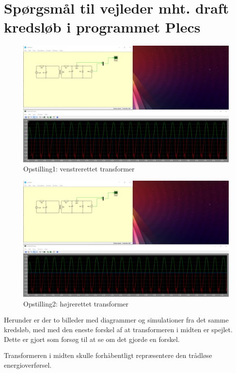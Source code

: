\documentclass[a4paper,11pt]{memoir}
\begin{document}
\chapter{Spørgsmål til vejleder mht. draft kredsløb i programmet Plecs}

\newpage

\begin{figure}[htbp]
\centering
\includegraphics[width=13cm]{Schematics/161031_Plecs2.png}
\caption{Opstilling1: venstrerettet transformer}
\end{figure}

\begin{figure}[H]
\centering
\includegraphics[width=1\textwidth]{Schematics/161031_Plecs2.png}
\caption{Opstilling2: højrerettet transformer}
\end{figure}
\newpage

Herunder er der to billeder med diagrammer og simulationer fra det samme kredsløb, med med den eneste forskel af at transformeren i midten er spejlet. Dette er gjort som forsøg til at se om det gjorde en forskel.

Transformeren i midten skulle forhåbentligt repræsentere den trådløse energioverførsel.
\end{document}
